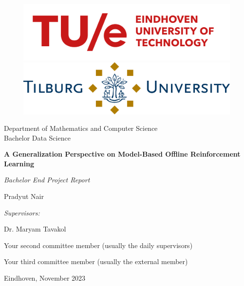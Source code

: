 \documentclass[12pt,a4paper,footinclude=true,twoside,headinclude=true]{report}
\begin{document}
\begin{titlepage}
\centering
\begin{figure}
    \centering
    \begin{minipage}{0.45\linewidth}
        \includegraphics[width=\linewidth]{0_Misc/tue_logo.png}
    \end{minipage}
    \begin{minipage}{0.45\linewidth}
        \includegraphics[width=\linewidth]{0_Misc/tiu_logo.png}
    \end{minipage}
\end{figure}

\par
Department of Mathematics and Computer Science\\
Bachelor Data Science  

\vspace{3cm}
{\LARGE\textbf{A Generalization Perspective on Model-Based Offline Reinforcement Learning}}\par\vspace{0.5cm}
{\large\textit{Bachelor End Project Report}}\par\vspace{1cm}
{\large Pradyut Nair}\par

\vfill

\emph{Supervisors:}\par
Dr. Maryam Tavakol \par
Your second committee member (usually the daily supervisors)\par
Your third committee member (usually the external member)\par

\vspace{2cm}

{Eindhoven, November 2023}

\end{titlepage}
\end{document}
